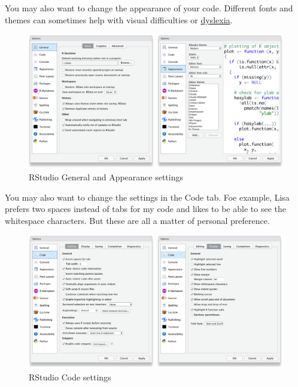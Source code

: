 \documentclass[
  oneside]{book}
\begin{document}
You may also want to change the appearance of your code. Different fonts and themes can sometimes help with visual difficulties or \href{https://datacarpentry.org/blog/2017/09/coding-and-dyslexia}{dyslexia}.

\begin{figure}

{\centering \includegraphics[width=1\linewidth]{images/rstudio_settings_general_appearance} 

}

\caption{RStudio General and Appearance settings}\label{fig:settings-general}
\end{figure}

You may also want to change the settings in the Code tab. Foe example, Lisa prefers two spaces instead of tabs for my code and likes to be able to see the whitespace characters. But these are all a matter of personal preference.

\begin{figure}

{\centering \includegraphics[width=1\linewidth]{images/rstudio_settings_code} 

}

\caption{RStudio Code settings}\label{fig:settings-code}
\end{figure}
\end{document}
